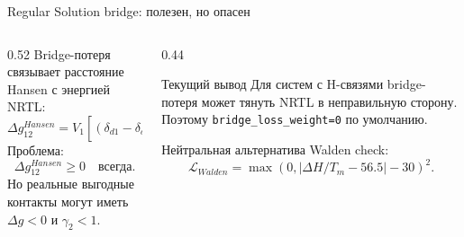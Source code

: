 \documentclass[aspectratio=169,10pt]{beamer}
\begin{document}
\begin{frame}{Regular Solution bridge: полезен, но опасен}
  \small
  \begin{columns}[T,onlytextwidth]
    \begin{column}{0.52\textwidth}
      Bridge-потеря связывает расстояние Hansen с энергией NRTL:
      \[
        \Delta g_{12}^{Hansen}=V_1[(\delta_{d1}-\delta_{d2})^2+
        \kappa_p(\delta_{p1}-\delta_{p2})^2+
        \kappa_h(\delta_{h1}-\delta_{h2})^2].
      \]
      Проблема:
      \[
        \Delta g_{12}^{Hansen}\ge0 \quad \text{всегда}.
      \]
      Но реальные выгодные контакты могут иметь $\Delta g<0$ и $\gamma_2<1$.
    \end{column}
    \begin{column}{0.44\textwidth}
      \begin{block}{Текущий вывод}
        \scriptsize
        Для систем с H-связями bridge-потеря может тянуть NRTL в неправильную сторону. Поэтому \texttt{bridge\_loss\_weight=0} по умолчанию.
      \end{block}
      \begin{block}{Нейтральная альтернатива}
        \scriptsize
        Walden check:
        \[
          \mathcal{L}_{Walden}=\max(0,|\Delta H/T_m-56.5|-30)^2.
        \]
      \end{block}
    \end{column}
  \end{columns}
\end{frame}
\end{document}
